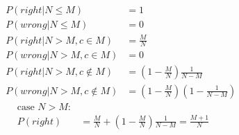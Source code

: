 \begin{align}
&&P(right | N \leq M) &= 1 \\
&&P(wrong | N \leq M) &= 0 \\
&&P(right | N > M, c \in M) &= \frac{M}{N} \\
&&P(wrong | N > M, c \in M) &= 0 \\
&&P(right | N > M, c \notin M) &= (1 - \frac{M}{N}) \frac{1}{N-M} \\
&&P(wrong | N > M, c \notin M) &= (1 - \frac{M}{N}) (1 - \frac{1}{N-M})
\end{align}
\begin{align}
\mbox{case } N > M:& \\
P(right) &= \frac{M}{N} + (1 - \frac{M}{N}) \frac{1}{N-M} = \frac{M+1}{N}
\end{align}